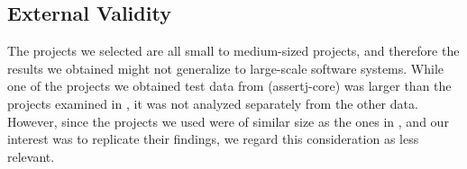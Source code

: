 
\subsection{External Validity}

The projects we selected are all small to medium-sized projects,
and therefore the results we obtained might not generalize to
large-scale software systems. While one of the projects we obtained
test data from (assertj-core) was larger than the projects examined in
\cite{cruciani2019scalable}, it was not analyzed separately from the
other data. However, since the projects we used were of similar size
as the ones in \cite{cruciani2019scalable}, and our interest was to
replicate their findings, we regard this consideration as less relevant.
